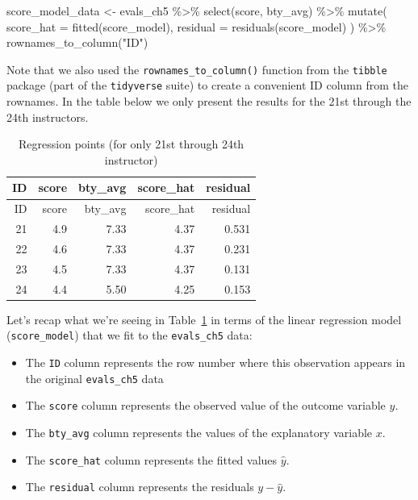 \documentclass[
  letterpaper,
  DIV=11,
  numbers=noendperiod]{scrreprt}
\newenvironment{Shaded}{\begin{snugshade}}{\end{snugshade}}
\newcommand{\AttributeTok}[1]{\textcolor[rgb]{0.40,0.45,0.13}{#1}}
\newcommand{\FunctionTok}[1]{\textcolor[rgb]{0.28,0.35,0.67}{#1}}
\newcommand{\NormalTok}[1]{\textcolor[rgb]{0.00,0.23,0.31}{#1}}
\newcommand{\OtherTok}[1]{\textcolor[rgb]{0.00,0.23,0.31}{#1}}
\newcommand{\SpecialCharTok}[1]{\textcolor[rgb]{0.37,0.37,0.37}{#1}}
\newcommand{\StringTok}[1]{\textcolor[rgb]{0.13,0.47,0.30}{#1}}
\theoremstyle{definition}
\theoremstyle{remark}
\begin{document}
\begin{Shaded}
\begin{Highlighting}[]
\NormalTok{score\_model\_data }\OtherTok{\textless{}{-}}\NormalTok{ evals\_ch5 }\SpecialCharTok{\%\textgreater{}\%} 
  \FunctionTok{select}\NormalTok{(score, bty\_avg) }\SpecialCharTok{\%\textgreater{}\%} 
  \FunctionTok{mutate}\NormalTok{(}
    \AttributeTok{score\_hat =} \FunctionTok{fitted}\NormalTok{(score\_model),}
    \AttributeTok{residual =} \FunctionTok{residuals}\NormalTok{(score\_model)}
\NormalTok{    ) }\SpecialCharTok{\%\textgreater{}\%} 
  \FunctionTok{rownames\_to\_column}\NormalTok{(}\StringTok{"ID"}\NormalTok{)}
\end{Highlighting}
\end{Shaded}

Note that we also used the \texttt{rownames\_to\_column()} function from
the \texttt{tibble} package (part of the \texttt{tidyverse} suite) to
create a convenient ID column from the rownames. In the table below we
only present the results for the 21st through the 24th instructors.

\hypertarget{tbl-reg-points}{}
\begin{longtable}[]{@{}rrrrr@{}}
\caption{\label{tbl-reg-points}Regression points (for only 21st through
24th instructor)}\tabularnewline
\toprule()
ID & score & bty\_avg & score\_hat & residual \\
\midrule()
\endfirsthead
\toprule()
ID & score & bty\_avg & score\_hat & residual \\
\midrule()
\endhead
21 & 4.9 & 7.33 & 4.37 & 0.531 \\
22 & 4.6 & 7.33 & 4.37 & 0.231 \\
23 & 4.5 & 7.33 & 4.37 & 0.131 \\
24 & 4.4 & 5.50 & 4.25 & 0.153 \\
\bottomrule()
\end{longtable}

Let's recap what we're seeing in Table~\ref{tbl-reg-points} in terms of
the linear regression model (\texttt{score\_model}) that we fit to the
\texttt{evals\_ch5} data:

\begin{itemize}
\item
  The \texttt{ID} column represents the row number where this
  observation appears in the original \texttt{evals\_ch5} data
\item
  The \texttt{score} column represents the observed value of the outcome
  variable \(y\).
\item
  The \texttt{bty\_avg} column represents the values of the explanatory
  variable \(x\).
\item
  The \texttt{score\_hat} column represents the fitted values
  \(\widehat{y}\).
\item
  The \texttt{residual} column represents the residuals
  \(y - \widehat{y}\).
\end{itemize}
\end{document}
